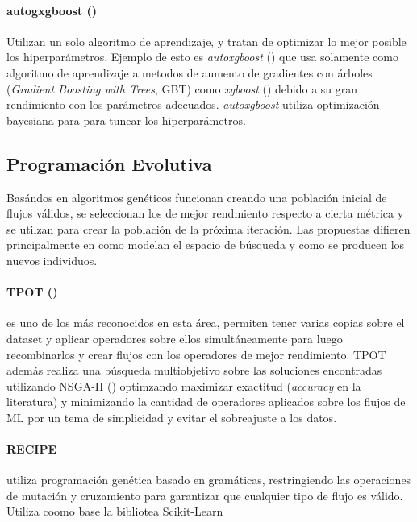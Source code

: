       \paragraph*{autogxgboost (\cite{thomas2018automatic})} Utilizan un solo algoritmo de aprendizaje, y tratan de optimizar lo mejor posible los hiperpar\'ametros. Ejemplo de esto es \textit{autoxgboost} (\cite{thomas2018automatic}) que usa solamente como algoritmo de aprendizaje a metodos de aumento de gradientes con \'arboles (\textit{Gradient Boosting with Trees}, GBT) como \textit{xgboost} (\cite{chen2016xgboost}) debido a su gran rendimiento con los par\'ametros adecuados. \textit{autoxgboost} utiliza optimizaci\'on bayesiana para para tunear los hiperpar\'ametros.
    
\subsection{Programaci\'on Evolutiva}
     Bas\'andos en algoritmos gen\'eticos funcionan creando una poblaci\'on inicial de flujos v\'alidos, se seleccionan los de mejor rendmiento respecto a cierta m\'etrica y se utilzan para crear la poblaci\'on de la pr\'oxima iteraci\'on. Las propuestas difieren principalmente en como modelan el espacio de b\'usqueda y como se producen los nuevos individuos.
     \paragraph*{TPOT (\cite{pmlr-v64-olson_tpot_2016})} es uno de los m\'as reconocidos en esta \'area, permiten tener varias copias sobre el dataset y aplicar operadores sobre ellos simult\'aneamente para luego recombinarlos y crear flujos con los operadores de mejor rendimiento. TPOT adem\'as realiza una b\'usqueda multiobjetivo sobre las soluciones encontradas utilizando NSGA-II (\cite{deb2002fast}) optimzando maximizar exactitud (\textit{accuracy} en la literatura) y minimizando la cantidad de operadores aplicados sobre los flujos de ML por un tema de simplicidad y evitar el sobreajuste a los datos.

     \paragraph*{RECIPE} utiliza programaci\'on gen\'etica basado en gram\'aticas, restringiendo las operaciones de mutaci\'on y cruzamiento para garantizar que cualquier tipo de flujo es v\'alido. Utiliza coomo base la bibliotea Scikit-Learn

